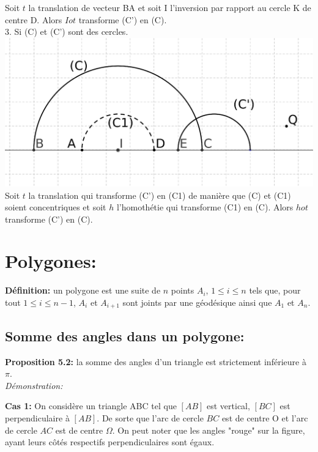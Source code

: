\documentclass[a4paper, 12pt, twoside]{book}
\begin{document}
 Soit $t$ la translation de vecteur BA et soit I l'inversion par rapport au cercle K de centre D. Alors $Iot$ transforme (C') en (C).\\
 
 3. Si (C) et (C') sont des cercles.\\
 
 
 \includegraphics[scale=0.5]{figures/hyper115.eps} \\
 
 Soit $t$ la translation qui transforme (C') en (C1) de manière que (C) et (C1) soient concentriques et soit $h$ l'homothétie qui transforme (C1) en (C). Alors $hot$ transforme (C') en (C).\\
 
 
 
 
 \section{Polygones:}
 
 \textbf{Définition:} un polygone est une suite de $n$ points $A_{i}$, $1\leq i\leq n$ tels que, pour tout $1\leq i\leq n-1$, $A_{i}$ et $A_{i+1}$ sont joints par une géodésique ainsi que $A_{1}$ et $A_{n}$.
 
 \subsection{Somme des angles dans un polygone:}
 
 \textbf{Proposition 5.2:} la somme des angles d'un triangle est strictement inférieure à $\pi$.\\
 
 \textit{Démonstration:}\
 
 
 \textbf{Cas 1:} On considère un triangle ABC tel que $[AB]$ est vertical, $[BC]$ est perpendiculaire à $[AB]$. De sorte que l'arc de cercle $BC$ est de centre O et  l'arc de cercle $AC$ est de centre $\Omega$. On peut noter que les angles "rouge" sur la figure, ayant leurs côtés respectifs perpendiculaires sont égaux.\
 
\end{document}

